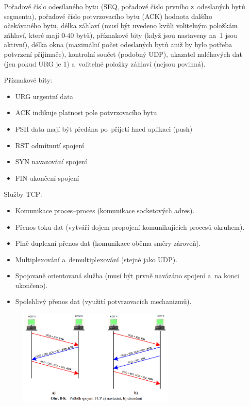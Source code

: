 Pořadové číslo odesílaného bytu (SEQ, pořadové číslo prvního z~odeslaných bytů segmentu), pořadové číslo potvrzovacího bytu (ACK) hodnota dalšího očekávaného bytu, délka záhlaví (musí být uvedeno kvůli volitelným položkám záhlaví, které mají 0-40 bytů), příznakové bity (když jsou nastaveny na~1 jsou aktivní), délka okna (maximální počet odeslaných bytů aniž by bylo potřeba potvrzení přijímače), kontrolní součet (podobný UDP), ukazatel naléhavých dat (jen pokud URG je 1) a~volitelné položky záhlaví (nejsou povinná).

\vspace{1.5cm} %
Příznakové bity:
\begin{itemize}[noitemsep]
    \item URG urgentní data
    \item ACK indikuje platnost pole potvrzovacího bytu
    \item PSH data mají být předána po~přijetí hned aplikaci (push)
    \item RST odmítnutí spojení
    \item SYN navazování spojení
    \item FIN ukončení spojení
\end{itemize}

Služby TCP:
\begin{itemize}[noitemsep]
    \item Komunikace proces--proces (komunikace socketových adres).
    \item Přenos toku dat (vytváří dojem propojení komunikujících procesů okruhem).
    \item Plně duplexní přenos dat (komunikace oběma směry zároveň).
    \item Multiplexování a~demultiplexování (stejné jako UDP).
    \item Spojovaně orientovaná služba (musí být prvně navázáno spojení a~na konci ukončeno).
    \item Spolehlivý přenos dat (využití potvrzovacích mechanizmů).
\end{itemize}

\begin{figure}[!h]
    \centering
    \includegraphics[width=0.7\textwidth]{obrazky/032.png}
\end{figure}

